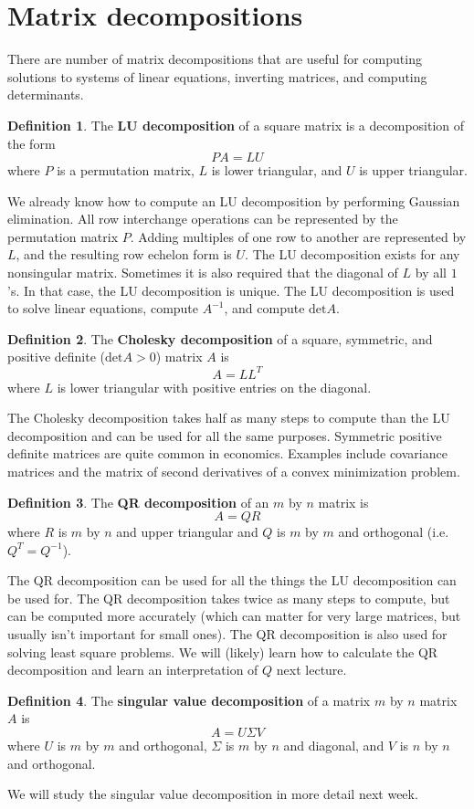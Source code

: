 \documentclass[12pt,reqno]{amsart}
\renewcommand{\det}{\mathrm{det}}
\theoremstyle{definition}
\newtheorem{definition}{Definition}[section]
\begin{document}
\section{Matrix decompositions}

There are number of matrix decompositions that are useful for
computing solutions to systems of linear equations, inverting
matrices, and computing determinants. 

\begin{definition}
  The \textbf{LU decomposition} of a square matrix is a decomposition
  of the form
  \[ P A = L U \]
  where $P$ is a permutation matrix, $L$ is lower triangular, and $U$
  is upper triangular. 
\end{definition}
We already know how to compute an LU decomposition by performing
Gaussian elimination. All row interchange operations can be
represented by the permutation matrix $P$. Adding multiples of one row to
another are represented by $L$, and the resulting row echelon form is
$U$. The LU decomposition exists for any nonsingular matrix. Sometimes
it is also required that the diagonal of $L$ by all $1$'s. In that
case, the LU decomposition is unique. The LU decomposition is used to
solve linear equations, compute $A^{-1}$, and compute $\det A$.  

\begin{definition}
  The \textbf{Cholesky decomposition} of a square, symmetric, and
  positive definite ($\det A > 0$) matrix $A$ is
  \[ A = L L^T \] 
  where $L$ is lower triangular with positive entries on the
  diagonal. 
\end{definition}
The Cholesky decomposition takes half as many steps to compute than
the LU decomposition and can be used for all the same
purposes. Symmetric positive definite matrices are quite common in
economics. Examples include covariance matrices and the matrix of
second derivatives of a convex minimization problem. 

\begin{definition}
  The \textbf{QR decomposition} of an $m$ by $n$ matrix is 
  \[ A = QR \]
  where $R$ is $m$ by $n$ and upper triangular and $Q$ is $m$ by $m$
  and orthogonal (i.e.\ $Q^T = Q^{-1}$).
\end{definition}
The QR decomposition can be used for all the things the LU
decomposition can be used for. The QR decomposition takes twice as
many steps to compute, but can be computed more accurately (which can
matter for very large matrices, but usually isn't important for small
ones).  The QR decomposition is also used for solving least square
problems. We will (likely) learn how to calculate the QR decomposition
and learn an interpretation of $Q$ next lecture. 

\begin{definition}
  The \textbf{singular value decomposition} of a matrix $m$ by $n$
  matrix $A$ is
  \[ A = U \Sigma V \]
  where $U$ is $m$ by $m$ and orthogonal, $\Sigma$ is $m$ by $n$ and
  diagonal, and $V$ is $n$ by $n$ and orthogonal.
\end{definition}
We will study the singular value decomposition in more detail next
week. 
\end{document}
